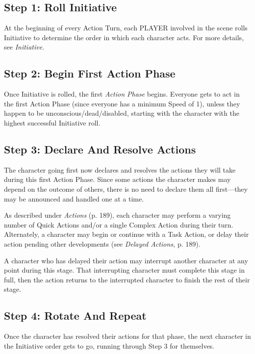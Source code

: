 \subsection{Step 1: Roll Initiative}

At the beginning of every Action Turn, each PLAYER 
involved in the scene rolls Initiative to determine the 
order in which each character acts. For more details, 
see \textit{Initiative.}

\subsection{Step 2: Begin First Action Phase}

Once Initiative is rolled, the first  \textit{Action Phase}
begins. Everyone gets to act in the first Action Phase 
(since everyone has a minimum Speed of 1), unless 
they happen to be unconscious/dead/disabled, starting
with the character with the highest successful
Initiative roll.

\subsection{Step 3: Declare And Resolve Actions}

The character going first now declares and resolves 
the actions they will take during this first Action 
Phase. Since some actions the character makes may 
depend on the outcome of others, there is no need 
to declare them all first—they may be announced 
and handled one at a time.

As described under \textit{Actions} (p. 189), each character
may perform a varying number of Quick Actions
and/or a single Complex Action during their turn. 
Alternately, a character may begin or continue with 
a Task Action, or delay their action pending other 
developments (see \textit{Delayed Actions,} p. 189).

A character who has delayed their action may 
interrupt another character at any point during this 
stage. That interrupting character must complete 
this stage in full, then the action returns to the interrupted
character to finish the rest of their stage.

\subsection{Step 4: Rotate And Repeat}

Once the character has resolved their actions for 
that phase, the next character in the Initiative order 
gets to go, running through Step 3 for themselves.

